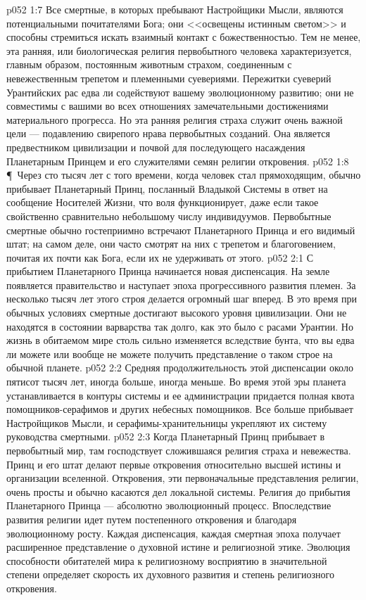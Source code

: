 \vs p052 1:7 Все смертные, в которых пребывают Настройщики Мысли, являются потенциальными почитателями Бога; они <<освещены истинным светом>> и способны стремиться искать взаимный контакт с божественностью. Тем не менее, эта ранняя, или биологическая религия первобытного человека характеризуется, главным образом, постоянным животным страхом, соединенным с невежественным трепетом и племенными суевериями. Пережитки суеверий Урантийских рас едва ли содействуют вашему эволюционному развитию; они не совместимы с вашими во всех отношениях замечательными достижениями материального прогресса. Но эта ранняя религия страха служит очень важной цели --- подавлению свирепого нрава первобытных созданий. Она является предвестником цивилизации и почвой для последующего насаждения Планетарным Принцем и его служителями семян религии откровения.
\vs p052 1:8 \P\ Через сто тысяч лет с того времени, когда человек стал прямоходящим, обычно прибывает Планетарный Принц, посланный Владыкой Системы в ответ на сообщение Носителей Жизни, что воля функционирует, даже если такое свойственно сравнительно небольшому числу индивидуумов. Первобытные смертные обычно гостеприимно встречают Планетарного Принца и его видимый штат; на самом деле, они часто смотрят на них с трепетом и благоговением, почитая их почти как Бога, если их не удерживать от этого.
\vs p052 2:1 С прибытием Планетарного Принца начинается новая диспенсация. На земле появляется правительство и наступает эпоха прогрессивного развития племен. За несколько тысяч лет этого строя делается огромный шаг вперед. В это время при обычных условиях смертные достигают высокого уровня цивилизации. Они не находятся в состоянии варварства так долго, как это было с расами Урантии. Но жизнь в обитаемом мире столь сильно изменяется вследствие бунта, что вы едва ли можете или вообще не можете получить представление о таком строе на обычной планете.
\vs p052 2:2 Средняя продолжительность этой диспенсации около пятисот тысяч лет, иногда больше, иногда меньше. Во время этой эры планета устанавливается в контуры системы и ее администрации придается полная квота помощников\hyp{}серафимов и других небесных помощников. Все больше прибывает Настройщиков Мысли, и серафимы\hyp{}хранительницы укрепляют их систему руководства смертными.
\vs p052 2:3 Когда Планетарный Принц прибывает в первобытный мир, там господствует сложившаяся религия страха и невежества. Принц и его штат делают первые откровения относительно высшей истины и организации вселенной. Откровения, эти первоначальные представления религии, очень просты и обычно касаются дел локальной системы. Религия до прибытия Планетарного Принца --- абсолютно эволюционный процесс. Впоследствие развития религии идет путем постепенного откровения и благодаря эволюционному росту. Каждая диспенсация, каждая смертная эпоха получает расширенное представление о духовной истине и религиозной этике. Эволюция способности обитателей мира к религиозному восприятию в значительной степени определяет скорость их духовного развития и степень религиозного откровения.
